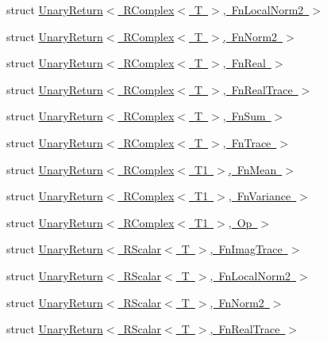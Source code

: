 \begin{DoxyCompactItemize}
\item 
struct \mbox{\hyperlink{structENSEM_1_1UnaryReturn_3_01RComplex_3_01T_01_4_00_01FnLocalNorm2_01_4}{Unary\+Return$<$ R\+Complex$<$ T $>$, Fn\+Local\+Norm2 $>$}}
\item 
struct \mbox{\hyperlink{structENSEM_1_1UnaryReturn_3_01RComplex_3_01T_01_4_00_01FnNorm2_01_4}{Unary\+Return$<$ R\+Complex$<$ T $>$, Fn\+Norm2 $>$}}
\item 
struct \mbox{\hyperlink{structENSEM_1_1UnaryReturn_3_01RComplex_3_01T_01_4_00_01FnReal_01_4}{Unary\+Return$<$ R\+Complex$<$ T $>$, Fn\+Real $>$}}
\item 
struct \mbox{\hyperlink{structENSEM_1_1UnaryReturn_3_01RComplex_3_01T_01_4_00_01FnRealTrace_01_4}{Unary\+Return$<$ R\+Complex$<$ T $>$, Fn\+Real\+Trace $>$}}
\item 
struct \mbox{\hyperlink{structENSEM_1_1UnaryReturn_3_01RComplex_3_01T_01_4_00_01FnSum_01_4}{Unary\+Return$<$ R\+Complex$<$ T $>$, Fn\+Sum $>$}}
\item 
struct \mbox{\hyperlink{structENSEM_1_1UnaryReturn_3_01RComplex_3_01T_01_4_00_01FnTrace_01_4}{Unary\+Return$<$ R\+Complex$<$ T $>$, Fn\+Trace $>$}}
\item 
struct \mbox{\hyperlink{structENSEM_1_1UnaryReturn_3_01RComplex_3_01T1_01_4_00_01FnMean_01_4}{Unary\+Return$<$ R\+Complex$<$ T1 $>$, Fn\+Mean $>$}}
\item 
struct \mbox{\hyperlink{structENSEM_1_1UnaryReturn_3_01RComplex_3_01T1_01_4_00_01FnVariance_01_4}{Unary\+Return$<$ R\+Complex$<$ T1 $>$, Fn\+Variance $>$}}
\item 
struct \mbox{\hyperlink{structENSEM_1_1UnaryReturn_3_01RComplex_3_01T1_01_4_00_01Op_01_4}{Unary\+Return$<$ R\+Complex$<$ T1 $>$, Op $>$}}
\item 
struct \mbox{\hyperlink{structENSEM_1_1UnaryReturn_3_01RScalar_3_01T_01_4_00_01FnImagTrace_01_4}{Unary\+Return$<$ R\+Scalar$<$ T $>$, Fn\+Imag\+Trace $>$}}
\item 
struct \mbox{\hyperlink{structENSEM_1_1UnaryReturn_3_01RScalar_3_01T_01_4_00_01FnLocalNorm2_01_4}{Unary\+Return$<$ R\+Scalar$<$ T $>$, Fn\+Local\+Norm2 $>$}}
\item 
struct \mbox{\hyperlink{structENSEM_1_1UnaryReturn_3_01RScalar_3_01T_01_4_00_01FnNorm2_01_4}{Unary\+Return$<$ R\+Scalar$<$ T $>$, Fn\+Norm2 $>$}}
\item 
struct \mbox{\hyperlink{structENSEM_1_1UnaryReturn_3_01RScalar_3_01T_01_4_00_01FnRealTrace_01_4}{Unary\+Return$<$ R\+Scalar$<$ T $>$, Fn\+Real\+Trace $>$}}
\item 

\end{DoxyCompactItemize}
